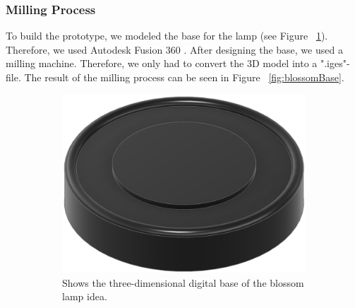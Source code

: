 \documentclass[04.3_buildingProcess.tex]{subfiles}
\begin{document}
    \subsubsection{Milling Process}
    \begin{flushleft}
        To build the prototype, we modeled the base for the lamp (see Figure ~\ref{fig:blossomBaseModel}). 
        Therefore, we used Autodesk Fusion 360 \cite{autodeskFusion360}. After designing the base, we used a 
        milling machine. Therefore, we only had to convert the 3D model into a ".iges"-file.
        The result of the milling process can be seen in Figure ~\ref{fig:blossomBase}.

        \begin{figure}[H]
            \centering
            \begin{subfigure}{.45\textwidth}
                \centering
                \includegraphics[scale=0.25]{images/materialProcess/FlowerLamp.png}
                \caption{Shows the three-dimensional digital base of the blossom lamp idea.}
                \label{fig:blossomBaseModel}
                \vspace{6mm}
            \end{subfigure}
            \hspace{1mm}
            \begin{subfigure}{.45\textwidth}
                \centering

\end{subfigure}
\end{figure}
\end{flushleft}
\end{document}
